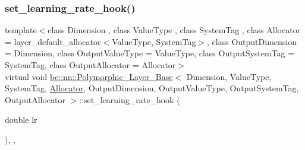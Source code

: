 \mbox{\label{structbc_1_1nn_1_1Polymorphic__Layer__Base_add15aef38db94de6066d048149723eea}} 
\subsubsection{\texorpdfstring{set\+\_\+learning\+\_\+rate\+\_\+hook()}{set\_learning\_rate\_hook()}\hspace{0.1cm}{\footnotesize\ttfamily [2/2]}}
{\footnotesize\ttfamily template$<$class Dimension , class Value\+Type , class System\+Tag , class Allocator  = layer\+\_\+default\+\_\+allocator$<$\+Value\+Type, System\+Tag$>$, class Output\+Dimension  = Dimension, class Output\+Value\+Type  = Value\+Type, class Output\+System\+Tag  = System\+Tag, class Output\+Allocator  = Allocator$>$ \\
virtual void \hyperlink{structbc_1_1nn_1_1Polymorphic__Layer__Base}{bc\+::nn\+::\+Polymorphic\+\_\+\+Layer\+\_\+\+Base}$<$ Dimension, Value\+Type, System\+Tag, \hyperlink{classbc_1_1allocators_1_1Allocator}{Allocator}, Output\+Dimension, Output\+Value\+Type, Output\+System\+Tag, Output\+Allocator $>$\+::set\+\_\+learning\+\_\+rate\+\_\+hook (\begin{DoxyParamCaption}\item[{double}]{lr }\end{DoxyParamCaption})\hspace{0.3cm}{\ttfamily [inline]}, {\ttfamily [protected]}, {\ttfamily [virtual]}}

\mbox{\label{structbc_1_1nn_1_1Polymorphic__Layer__Base_a852126e97fd34bcc24c446615e3df3fa}} 
